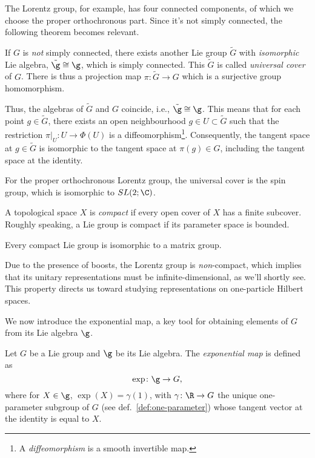 The Lorentz group, for example, has four connected components, of which we choose the proper orthochronous part. Since it's not simply connected, the following theorem becomes relevant.

\begin{theorem}\label{th:universal-cover}
    If $G$ is \emph{not} simply connected, there exists another Lie group $\tilde{G}$ with \emph{isomorphic} Lie algebra, $\tilde{\g} \cong \g$, which is simply connected. This $\tilde{G}$ is called \emph{universal cover} of $G$. There is thus a projection map $\pi \colon \tilde{G} \to G$ which is a surjective group homomorphism.
\end{theorem}

Thus, the algebras of $\tilde{G}$ and $G$ coincide, i.e., $\tilde{\g} \cong \g$. This means that for each point $g \in \tilde{G}$, there exists an open neighbourhood $g \in U \subset \tilde{G}$ such that the restriction $\pi|_U \colon U \to \Phi(U)$ is a diffeomorphism\footnote{A \emph{diffeomorphism} is a smooth invertible map.}. Consequently, the tangent space at $g \in \tilde{G}$ is isomorphic to the tangent space at $\pi(g) \in G$, including the tangent space at the identity.

For the proper orthochronous Lorentz group, the universal cover is the spin group, which is isomorphic to $SL(2;\C)$.

\begin{definition}\label{def:compact}
    A topological space $X$ is \emph{compact} if every open cover of $X$ has a finite subcover. Roughly speaking, a Lie group is compact if its parameter space is bounded.
\end{definition}

\begin{theorem}
    Every compact Lie group is isomorphic to a matrix group.
\end{theorem}

Due to the presence of boosts, the Lorentz group is \emph{non}-compact, which implies that its unitary representations must be infinite-dimensional, as we'll shortly see. This property directs us toward studying representations on one-particle Hilbert spaces.

We now introduce the exponential map, a key tool for obtaining elements of $G$ from its Lie algebra $\g$.

\begin{definition}\label{def:exponential-map}
    Let $G$ be a Lie group and $\g$ be its Lie algebra. The \emph{exponential map} is defined as
    \begin{equation}\label{eq:exp-map}
        \exp\colon \g \to G ,
    \end{equation}
    where for $X \in \g$, $\exp(X) = \gamma(1)$, with $\gamma\colon \R \to G$ the unique one-parameter subgroup of $G$ (see def.~\ref{def:one-parameter}) whose tangent vector at the identity is equal to $X$.
\end{definition}

